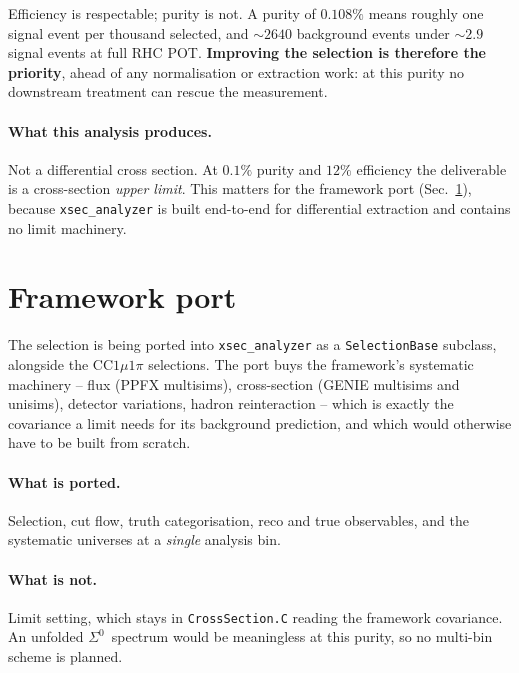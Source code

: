\documentclass[11pt,a4paper]{article}
\newcommand{\Szero}{\ensuremath{\Sigma^{0}}}
\begin{document}
\noindent Efficiency is respectable; purity is not. A purity of $0.108\%$ means
roughly one signal event per thousand selected, and $\sim\!2640$ background events
under $\sim\!2.9$ signal events at full RHC POT. \textbf{Improving the selection is
therefore the priority}, ahead of any normalisation or extraction work: at this
purity no downstream treatment can rescue the measurement.

\paragraph{What this analysis produces.} Not a differential cross section. At
$0.1\%$ purity and $12\%$ efficiency the deliverable is a cross-section
\emph{upper limit}. This matters for the framework port (Sec.~\ref{sec:port}),
because \texttt{xsec\_analyzer} is built end-to-end for differential extraction and
contains no limit machinery.

\section{Framework port}
\label{sec:port}

The selection is being ported into \texttt{xsec\_analyzer} as a
\texttt{SelectionBase} subclass, alongside the CC$1\mu1\pi$ selections. The port
buys the framework's systematic machinery -- flux (PPFX multisims),
cross-section (GENIE multisims and unisims), detector variations, hadron
reinteraction -- which is exactly the covariance a limit needs for its background
prediction, and which would otherwise have to be built from scratch.

\paragraph{What is ported.} Selection, cut flow, truth categorisation, reco and
true observables, and the systematic universes at a \emph{single} analysis bin.

\paragraph{What is not.} Limit setting, which stays in \texttt{CrossSection.C}
reading the framework covariance. An unfolded \Szero\ spectrum would be
meaningless at this purity, so no multi-bin scheme is planned.
\end{document}
